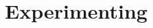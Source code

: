 \chapter{Experimenting}
\label{sec:experimenting}
\thispagestyle{fancy}

\lipsum

\clearemptydoublepage
